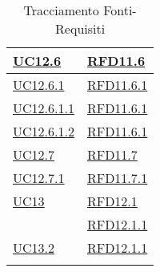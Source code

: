 \begin{longtable}{|>{\centering}m{5cm}|m{5cm}<{\centering}|}
\hyperref[UC12.6]{UC12.6} & \hyperlink{RFD11.6}{RFD11.6}\\ \hline
\hyperref[UC12.6.1]{UC12.6.1} & \hyperlink{RFD11.6.1}{RFD11.6.1}\\ \hline
\hyperref[UC12.6.1.1]{UC12.6.1.1} & \hyperlink{RFD11.6.1}{RFD11.6.1}\\ \hline
\hyperref[UC12.6.1.2]{UC12.6.1.2} & \hyperlink{RFD11.6.1}{RFD11.6.1}\\ \hline
\hyperref[UC12.7]{UC12.7} & \hyperlink{RFD11.7}{RFD11.7}\\ \hline
\hyperref[UC12.7.1]{UC12.7.1} & \hyperlink{RFD11.7.1}{RFD11.7.1}\\ \hline
\hyperref[UC13]{UC13} & \hyperlink{RFD12.1}{RFD12.1}\\
& \hyperlink{RFD12.1.1}{RFD12.1.1}\\ \hline
\hyperref[UC13.2]{UC13.2} & \hyperlink{RFD12.1.1}{RFD12.1.1}\\ \hline
\caption[Tracciamento Fonti-Requisiti]{Tracciamento Fonti-Requisiti}
\label{tabella:fonti-requi}
\end{longtable}
\clearpage
